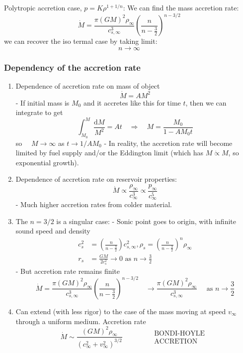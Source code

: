 \documentclass[12pt,a4paper]{article}
\begin{document}
\begin{example}
    {Polytropic accretion case, $p=K \rho^{1+1 / n}$: }{
        We can find the mass accretion rate:
        $$
        \dot{M}=\frac{\pi(G M)^2 \rho_{\infty}}{c_{s, \infty}^3}\left(\frac{n}{n-\frac{3}{2}}\right)^{n-3 / 2}
        $$
        we can recover the iso termal case by taking limit:
        $$
        n \rightarrow \infty
        $$
    }
\end{example}
\subsubsection{Dependency of the accretion rate}
\begin{enumerate}
    \item Dependence of accretion rate on mass of object
    $$
    \dot{M}=A M^2
    $$
    - If initial mass is $M_0$ and it accretes like this for time $t$, then we can integrate to get
    $$
    \int_{M_0}^M \frac{\mathrm{d} M}{M^2}=A t \quad \Rightarrow \quad M=\frac{M_0}{1-A M_0 t}
    $$
    so $\quad M \rightarrow \infty$ as $t \rightarrow 1 / A M_0$
    - In reality, the accretion rate will become limited by fuel supply and/or the Eddington limit (which has $M \dot{\propto} M$, so exponential growth).
    \item Dependence of accretion rate on reservoir properties:
    $$
    \dot{M} \propto \frac{\rho_{\infty}}{c_{\infty}^3} \propto \frac{p_{\infty}}{c_{\infty}^5}
    $$
    - Much higher accretion rates from colder material.
    \item The $n=3 / 2$ is a singular case:
    - Sonic point goes to origin, with infinite sound speed and density
    $$
    \begin{aligned}
    c_s^2 & =\left(\frac{n}{n-\frac{3}{2}}\right) c_{s, \infty}^2, \rho_s=\left(\frac{n}{n-\frac{3}{2}}\right)^n \rho_{\infty} \\
    r_s & =\frac{G M}{2 c_s^2} \rightarrow 0 \text { as } n \rightarrow \frac{3}{2}
    \end{aligned}
    $$
    - But accretion rate remains finite
    $$
    \dot{M}=\frac{\pi(G M)^2 \rho_{\infty}}{c_{s, \infty}^3}\left(\frac{n}{n-\frac{3}{2}}\right)^{n-3 / 2} \quad \rightarrow \frac{\pi(G M)^2 \rho_{\infty}}{c_{s, \infty}^3} \quad \text { as } n \rightarrow \frac{3}{2}
    $$
    \item Can extend (with less rigor) to the case of the mass moving at speed $v_{\infty}$ through a uniform medium. Accretion rate
    $$
    \dot{M} \sim \frac{(G M)^2 \rho_{\infty}}{\left(c_{\infty}^2+v_{\infty}^2\right)^{3 / 2}} \quad \quad \quad \begin{aligned}
    & \text { BONDI-HOYLE } \\
    & \text { ACCRETION }
    \end{aligned}
    $$
\end{enumerate}
\end{document}
